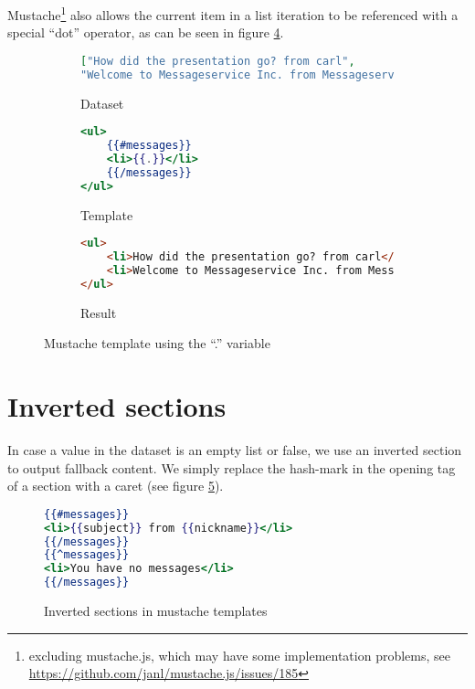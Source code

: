 \documentclass[thesis.tex]{subfiles}
\begin{document}
Mustache\footnote{excluding mustache.js, which may have some implementation
problems, see \url{https://github.com/janl/mustache.js/issues/185}} also allows
the current item in a list iteration to be referenced with a special ``dot''
operator, as can be seen in figure \ref{fig:dot-oper-example}.
\begin{figure}
	\centering
	\begin{subfigure}{\linewidth}
		\caption{Dataset}
		\label{fig:dot-oper-example.json}
		\begin{lstlisting}[language=JSON]
["How did the presentation go? from carl",
"Welcome to Messageservice Inc. from Messageservice Inc."]
		\end{lstlisting}
	\end{subfigure}
	
	\begin{subfigure}{\linewidth}
		\caption{Template}
		\label{fig:dot-oper-example.mustache}
		\begin{lstlisting}[language=mustache]
<ul>
	{{#messages}}
	<li>{{.}}</li>
	{{/messages}}
</ul>
		\end{lstlisting}
	\end{subfigure}
	
	\begin{subfigure}{\linewidth}
		\caption{Result}
		\label{fig:dot-oper-example.html}
		\begin{lstlisting}[language=HTML]
<ul>
	<li>How did the presentation go? from carl</li>
	<li>Welcome to Messageservice Inc. from Messageservice Inc.</li>
</ul>
		\end{lstlisting}
	\end{subfigure}
	\caption{Mustache template using the ``.'' variable}
	\label{fig:dot-oper-example}
\end{figure}

\section{Inverted sections}
\label{app:mustache-inverted}
In case a value in the dataset is an empty list or false, we use an inverted
section to output fallback content. We simply replace the hash-mark in the
opening tag of a section with a caret (see figure \ref{fig:inverted.mustache}).
\begin{figure}
	\centering
	\begin{lstlisting}[language=mustache]
{{#messages}}
<li>{{subject}} from {{nickname}}</li>
{{/messages}}
{{^messages}}
<li>You have no messages</li>
{{/messages}}
	\end{lstlisting}
	\caption{Inverted sections in mustache templates}
	\label{fig:inverted.mustache}
\end{figure}
\end{document}
